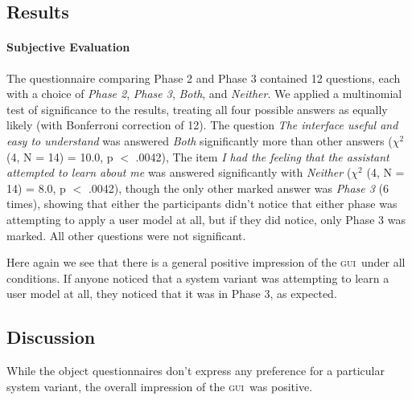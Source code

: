 \documentclass[11pt]{article}
\newcommand{\ui}[0]{\textsc{gui}}
\begin{document}
\subsection{Results}

\paragraph{Subjective Evaluation} The questionnaire comparing Phase 2 and Phase 3 contained 12 questions, each with a choice of \emph{Phase 2}, \emph{Phase 3}, \emph{Both}, and \emph{Neither}.  We applied a multinomial test of significance to the results, treating all four possible answers as equally likely (with Bonferroni correction of 12). The question \emph{The interface useful and easy to understand} was answered \emph{Both} significantly more than other answers  ($ \chi^2 $ (4, N = 14) = 10.0, p $<$ .0042), The item \emph{I had the feeling that the assistant attempted to learn about me} was answered significantly with \emph{Neither} ($ \chi^2 $ (4, N = 14) = 8.0, p $<$ .0042), though the only other marked answer was \emph{Phase 3} (6 times), showing that either the participants didn't notice that either phase was attempting to apply a user model at all, but if they did notice, only Phase 3 was marked. All other questions were not significant.

Here again we see that there is a general positive impression of the \ui\ under all conditions. If anyone noticed that a system variant was attempting to learn a user model at all, they noticed that it was in Phase 3, as expected. 

\subsection{Discussion}

While the object questionnaires don't express any preference for a particular system variant, the overall impression of the \ui\ was positive. 
\end{document}
